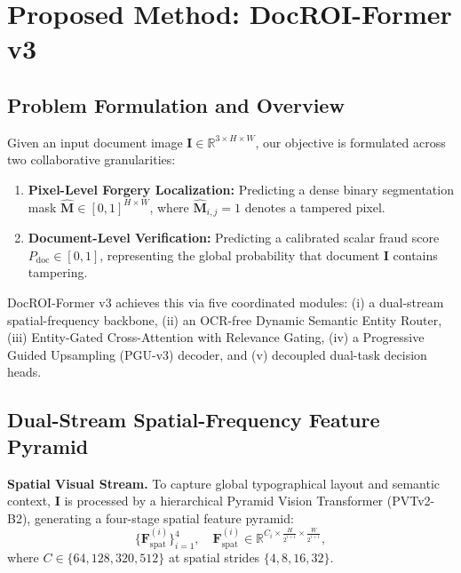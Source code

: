 
\section{Proposed Method: DocROI-Former v3}
\label{sec:method}

\subsection{Problem Formulation and Overview}
Given an input document image $\mathbf{I} \in \mathbb{R}^{3 \times H \times W}$, our objective is formulated across two collaborative granularities:
\begin{enumerate}
    \item \textbf{Pixel-Level Forgery Localization:} Predicting a dense binary segmentation mask $\hat{\mathbf{M}} \in [0, 1]^{H \times W}$, where $\hat{\mathbf{M}}_{i,j} = 1$ denotes a tampered pixel.
    \item \textbf{Document-Level Verification:} Predicting a calibrated scalar fraud score $P_{\text{doc}} \in [0, 1]$, representing the global probability that document $\mathbf{I}$ contains tampering.
\end{enumerate}

DocROI-Former v3 achieves this via five coordinated modules: (i) a dual-stream spatial-frequency backbone, (ii) an OCR-free Dynamic Semantic Entity Router, (iii) Entity-Gated Cross-Attention with Relevance Gating, (iv) a Progressive Guided Upsampling (PGU-v3) decoder, and (v) decoupled dual-task decision heads.

\subsection{Dual-Stream Spatial-Frequency Feature Pyramid}
\label{subsec:dual_stream}

\noindent\textbf{Spatial Visual Stream.} 
To capture global typographical layout and semantic context, $\mathbf{I}$ is processed by a hierarchical Pyramid Vision Transformer (PVTv2-B2), generating a four-stage spatial feature pyramid:
\begin{equation}
    \{\mathbf{F}_{\text{spat}}^{(i)}\}_{i=1}^4, \quad \mathbf{F}_{\text{spat}}^{(i)} \in \mathbb{R}^{C_i \times \frac{H}{2^{i+1}} \times \frac{W}{2^{i+1}}},
\end{equation}
where $C \in \{64, 128, 320, 512\}$ at spatial strides $\{4, 8, 16, 32\}$.

